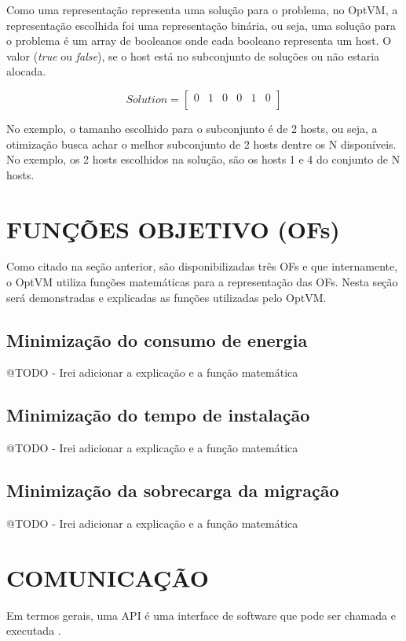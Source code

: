 Como uma representação representa uma solução para o problema, no OptVM, a 
representação escolhida foi uma representação binária, ou seja, uma solução
para o problema é um array de booleanos onde cada booleano representa um host.
O valor (\textit{true} ou \textit{false}), se o host está no subconjunto de soluções 
ou não estaria alocada.

\[
  Solution=
  \left[{\begin{array}{cccccc}
    0 & 1 & 0 & 0 & 1 & 0 \\
  \end{array}}\right
  ]
\]

No exemplo, o tamanho escolhido para o subconjunto é de 2 hosts, ou seja, 
a otimização busca achar o melhor subconjunto de 2 hosts dentre os N disponíveis. 
No exemplo, os 2 hosts escolhidos na solução, são os hosts 1 e 4 do conjunto de N hosts.

\section{FUNÇÕES OBJETIVO (OFs)}
Como citado na seção anterior, são disponibilizadas três OFs e que internamente, o OptVM
utiliza funções matemáticas para a representação das OFs. Nesta seção será demonstradas e
explicadas as funções utilizadas pelo OptVM.

\subsection{Minimização do consumo de energia}
@TODO - Irei adicionar a explicação e a função matemática

\subsection{Minimização do tempo de instalação}
@TODO - Irei adicionar a explicação e a função matemática

\subsection{Minimização da sobrecarga da migração}
@TODO - Irei adicionar a explicação e a função matemática

\section{COMUNICAÇÃO}
Em termos gerais, uma API é uma interface de software que pode ser chamada e executada \cite{eizinger}. 

